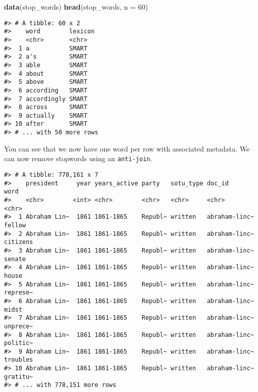 \documentclass[]{book}
\newenvironment{Shaded}{\begin{snugshade}}{\end{snugshade}}
\newcommand{\DataTypeTok}[1]{\textcolor[rgb]{0.13,0.29,0.53}{#1}}
\newcommand{\DecValTok}[1]{\textcolor[rgb]{0.00,0.00,0.81}{#1}}
\newcommand{\KeywordTok}[1]{\textcolor[rgb]{0.13,0.29,0.53}{\textbf{#1}}}
\newcommand{\NormalTok}[1]{#1}
\newcommand{\OperatorTok}[1]{\textcolor[rgb]{0.81,0.36,0.00}{\textbf{#1}}}
\newcommand{\StringTok}[1]{\textcolor[rgb]{0.31,0.60,0.02}{#1}}
\begin{document}
\begin{Shaded}
\begin{Highlighting}[]
\KeywordTok{data}\NormalTok{(stop_words)}
\KeywordTok{head}\NormalTok{(stop_words, }\DataTypeTok{n =} \DecValTok{60}\NormalTok{)}
\end{Highlighting}
\end{Shaded}

\begin{verbatim}
#> # A tibble: 60 x 2
#>    word        lexicon
#>    <chr>       <chr>  
#>  1 a           SMART  
#>  2 a's         SMART  
#>  3 able        SMART  
#>  4 about       SMART  
#>  5 above       SMART  
#>  6 according   SMART  
#>  7 accordingly SMART  
#>  8 across      SMART  
#>  9 actually    SMART  
#> 10 after       SMART  
#> # ... with 50 more rows
\end{verbatim}

You can see that we now have one word per row with associated metadata. We can now remove stopwords using an \texttt{anti-join}.

\begin{Shaded}
\end{Shaded}

\begin{verbatim}
#> # A tibble: 778,161 x 7
#>    president     year years_active party   sotu_type doc_id        word    
#>    <chr>        <int> <chr>        <chr>   <chr>     <chr>         <chr>   
#>  1 Abraham Lin~  1861 1861-1865    Republ~ written   abraham-linc~ fellow  
#>  2 Abraham Lin~  1861 1861-1865    Republ~ written   abraham-linc~ citizens
#>  3 Abraham Lin~  1861 1861-1865    Republ~ written   abraham-linc~ senate  
#>  4 Abraham Lin~  1861 1861-1865    Republ~ written   abraham-linc~ house   
#>  5 Abraham Lin~  1861 1861-1865    Republ~ written   abraham-linc~ represe~
#>  6 Abraham Lin~  1861 1861-1865    Republ~ written   abraham-linc~ midst   
#>  7 Abraham Lin~  1861 1861-1865    Republ~ written   abraham-linc~ unprece~
#>  8 Abraham Lin~  1861 1861-1865    Republ~ written   abraham-linc~ politic~
#>  9 Abraham Lin~  1861 1861-1865    Republ~ written   abraham-linc~ troubles
#> 10 Abraham Lin~  1861 1861-1865    Republ~ written   abraham-linc~ gratitu~
#> # ... with 778,151 more rows
\end{verbatim}
\end{document}
